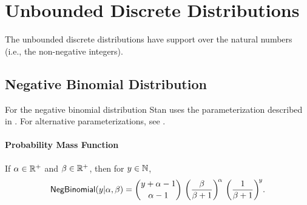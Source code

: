 \begin{description}
%
\end{description}



\chapter{Unbounded Discrete Distributions}

\noindent
The unbounded discrete distributions have support over the natural
numbers (i.e., the non-negative integers).


\section{Negative Binomial Distribution}

For the negative binomial distribution Stan uses the parameterization
described in \citet{GelmanEtAl:2013}.  For alternative parameterizations, see .

\subsubsection{Probability Mass Function}

If $\alpha \in \mathbb{R}^+$ and $\beta \in \mathbb{R}^+$, then for $y \in
\mathbb{N}$,
\[
\mbox{\sf NegBinomial}(y|\alpha,\beta)
 =
\binom{y + \alpha - 1}{\alpha - 1}
\,
\left( \frac{\beta}{\beta+1} \right)^{\!\alpha}
\,
\left( \frac{1}{\beta + 1} \right)^{\!y} \!.
\]


